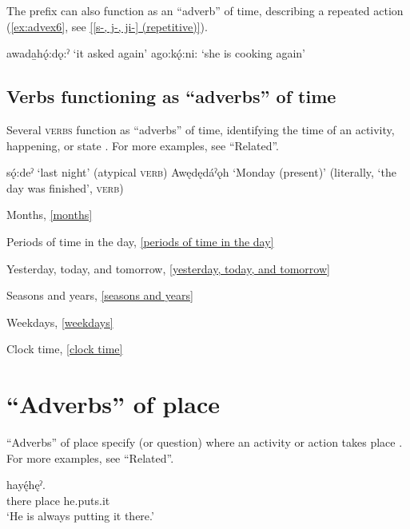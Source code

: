 The  \textsc{\repetitive} prefix can also function as an “adverb” of time, describing a repeated action (\ref{ex:advex6}, see \ref{[s-, j-, ji-] (repetitive)}).

\ea\label{ex:advex6}
\ea {}awada̱hǫ́:dǫ:ˀ ‘it asked again’
\ex {}ago:kǫ́:ni: ‘she is cooking again’
\z
\z



\subsection{Verbs functioning as “adverbs” of time}
Several \textsc{verbs} function as “adverbs” of time, identifying the time of an activity, happening, or state . For more examples, see “Related”.

\ea\label{ex:advex7}
\ea sǫ́:deˀ ‘last night’ (atypical \textsc{verb})
\ex Awędędáˀǫh ‘Monday (present)’ (literally, ‘the day was finished’, \textsc{verb})
\z
\z


\begin{CayugaRelated}
\item Months, \ref{months}

\item Periods of time in the day, \ref{periods of time in the day}

\item Yesterday, today, and tomorrow, \ref{yesterday, today, and tomorrow}

\item Seasons and years, \ref{seasons and years}

\item Weekdays, \ref{weekdays}

\item Clock time, \ref{clock time}
\end{CayugaRelated}

\section{“Adverbs” of place} \label{‘Adverbs’ of place}
“Adverbs” of place specify (or question) where an activity or action takes place . For more examples, see “Related”.

\ea\label{ex:advex19}
 \gll {}  hayę́hęˀ. \\
there place he.puts.it\\
\glt ‘He is always putting it there.’
\z

